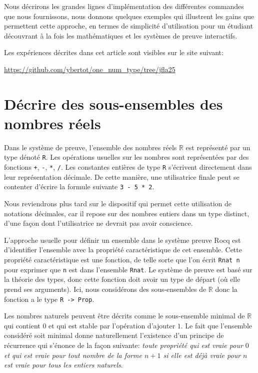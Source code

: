 \documentclass{jflart}
\begin{document}
Nous décrirons les grandes lignes d'implémentation des
différentes commandes que nous fournissons, nous donnons quelques exemples qui
illustrent les gains que permettent cette approche, en termes de
simplicité d'utilisation pour un étudiant découvrant à la fois les
mathématiques et les systèmes de preuve interactifs.

Les expériences décrites dans cet article sont visibles sur le site
suivant:

\url{https://github.com/ybertot/one_num_type/tree/jfla25}


\section{Décrire des sous-ensembles des nombres réels}
Dans le système de preuve, l'ensemble des nombres réels \(\mathbb R\)
est représenté par un type dénoté \texttt{R}.  Les opérations usuelles
sur les nombres sont représentées par des fonctions \texttt{+}, \texttt{-},
\texttt{*}, \texttt{/}.  Les constantes entières de type \texttt{R} s'écrivent
directement dans leur représentation décimale.  De cette manière, une
utilisatrice finale peut se contenter d'écrire la formule suivante
\texttt{3 - 5 * 2}.

Nous reviendrons plus tard sur le dispositif qui permet cette
utilisation de notations décimales, car il repose sur des nombres
entiers dans un type distinct, d'une façon dont l'utilisatrice ne
devrait pas avoir conscience.

L'approche usuelle pour définir un ensemble dans le système preuve
Rocq est d'identifier l'ensemble avec la propriété caractéristique de
cet ensemble.  Cette propriété caractéristique est une fonction, de
telle sorte que l'on écrit \texttt{Rnat n} pour exprimer que \texttt{n} est
dans l'ensemble \texttt{Rnat}.  Le système de preuve est basé sur la
théorie des types, donc cette fonction doit avoir un type de départ
(où elle prend ses arguments).  Ici, nous considérons des
sous-ensembles de \(\mathbb R\) donc la fonction a le type \texttt{R ->
  Prop}.

Les nombres naturels peuvent être décrits comme le sous-ensemble
minimal de \(\mathbb R\) qui contient \(0\) et qui est stable par
l'opération d'ajouter \(1\).  Le fait que l'ensemble considéré soit
minimal donne naturellement l'existence d'un principe de récurrence
qui s'énonce de la façon suivante: {\em toute propriété qui est vraie
  pour \(0\) et qui est vraie pour tout nombre de la forme \(n + 1\)
  si elle est déjà vraie pour \(n\) est vraie pour tous les entiers
  naturels}.
\end{document}
